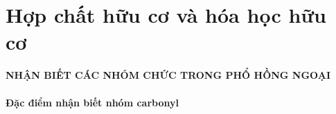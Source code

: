
\newcommand{\khungmuiten}[2][\mycolor]{
	\begin{tikzpicture}[declare function ={r=8cm;d=.04*r;}]
		\node(char)[font=\bfseries\sffamily,inner sep =2pt]{\tikz{
				\path (0,0)--(r,0) node[pos=0.5,midway]{#2};
		}};
		\path (char.north west) coordinate (A)
		(char.south west) coordinate (D)
		(char.north east) coordinate (B)
		([yshift=d]char.north east) coordinate (Bt)
		([xshift=2*d]char.east) coordinate (BtC)
		(char.south east) coordinate (C)
		([yshift=-d]char.south east) coordinate (Ct)
		;
		\filldraw [fill=#1!20,draw=#1!50!black,inner sep =1pt](A)--(B)--(Bt)--(BtC)--(Ct)--(C)--(D)--cycle;
		\node(char)[font=\bfseries\sffamily,inner sep =2pt]{\tikz{
				\path (0,0)--(4,0) node[pos=0.5,midway]{#2};
		}};
\end{tikzpicture}}
\renewcommand*\printatom[1]{\ensuremath{\mathbf{#1}}}
\newcommand*\mynode[1]{%
	\begin{tikzpicture}[remember picture]
		\node [%
		rectangle,
		rounded corners =3pt,
		minimum height =1cm,
		minimum width = .65cm,
		anchor=center, 
		fill = \maunhan!20,
		draw=\maunhan
		]
		{\printatom{#1}};
	\end{tikzpicture}
}
\renewcommand{\hinhphai}[2]{%
	\tcbsidebyside[
	sidebyside adapt=right,
	blanker,sidebyside gap=3mm,
	sidebyside align=top seam,
	]{%
		#1
	}{%
		#2
	}
}
\section{Hợp chất hữu cơ và hóa học hữu cơ}
\begin{tcolorbox}[colframe=\mycolor!50!black,colback=\mycolor!20,arc is angular,arc=0pt]
	\begin{center}
		{\bf\Large\color{\mycolor!50!black}\MakeUppercase{Nhận biết các nhóm chức trong phổ hồng ngoại}}
	\end{center}
\end{tcolorbox}
\paragraph{Đặc điểm nhận biết nhóm carbonyl}

